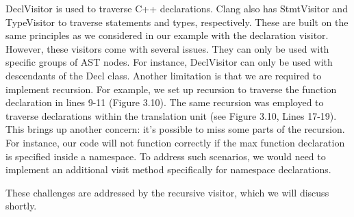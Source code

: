 DeclVisitor is used to traverse C++ declarations. Clang also has StmtVisitor and TypeVisitor to traverse statements and types, respectively. These are built on the same principles as we considered in our example with the declaration visitor. However, these visitors come with several issues. They can only be used with specific groups of AST nodes. For instance, DeclVisitor can only be used with descendants of the Decl class. Another limitation is that we are required to implement recursion. For example, we set up recursion to traverse the function declaration in lines 9-11 (Figure 3.10). The same recursion was employed to traverse declarations within the translation unit (see Figure 3.10, Lines 17-19). This brings up another concern: it's possible to miss some parts of the recursion. For instance, our code will not function correctly if the max function declaration is specified inside a namespace. To address such scenarios, we would need to implement an additional visit method specifically for namespace declarations.

These challenges are addressed by the recursive visitor, which we will discuss shortly.


















